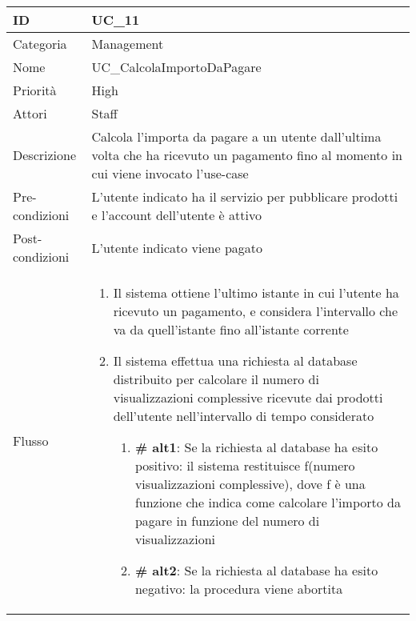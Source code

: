 \begin{center}
\begin{tabular}{ |p{2cm}|p{13.5cm}|  }
\hline
ID & UC\_11 \\\hline
Categoria & Management\\\hline
Nome & UC\_CalcolaImportoDaPagare\\\hline
Priorità & High \\\hline
Attori &  Staff \\\hline
Descrizione & Calcola l'importa da pagare a un utente dall'ultima volta che ha ricevuto un pagamento fino al momento in cui viene invocato l'use-case\\\hline
Pre-condizioni &  L'utente indicato ha il servizio per pubblicare prodotti e l'account dell'utente è attivo\\\hline
Post-condizioni &  L'utente indicato viene pagato\\\hline
Flusso &  	
		\begin{enumerate}
		\item Il sistema ottiene l'ultimo istante in cui l'utente ha ricevuto un pagamento, e considera l'intervallo che va da quell'istante fino all'istante corrente	
		\item Il sistema effettua una richiesta al database distribuito per calcolare il numero di visualizzazioni complessive ricevute dai prodotti dell'utente nell'intervallo di tempo considerato
		\begin{enumerate}[  ]
			\item \textbf{\# alt1}: Se la richiesta al database ha esito positivo: il sistema restituisce f(numero visualizzazioni complessive), dove f è una funzione che indica come calcolare l'importo da pagare in funzione del numero di visualizzazioni
			\item \textbf{\# alt2}: Se la richiesta al database ha esito negativo: la procedura viene abortita
		\end{enumerate}
		\end{enumerate}\\\hline
\end{tabular}
\label{table_use_case:11}\newline


\end{center}
